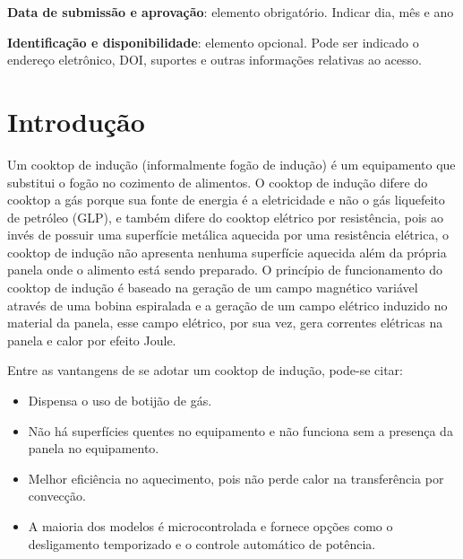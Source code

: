 \documentclass[
	article,			%
	11pt,				%
	oneside,			%
	a4paper,			%
	english,			%
	brazil,				%
	sumario=tradicional
	]{abntex2}
\begin{document}

\begin{center}\smaller
\textbf{Data de submissão e aprovação}: elemento obrigatório. Indicar dia, mês e ano

\textbf{Identificação e disponibilidade}: elemento opcional. Pode ser indicado 
o endereço eletrônico, DOI, suportes e outras informações relativas ao acesso.
\end{center}

\textual

\section{Introdução}

Um cooktop de indução (informalmente fogão de indução) é um equipamento que substitui o fogão no cozimento de alimentos. O cooktop de indução difere do cooktop a gás porque sua fonte de energia é a eletricidade e não o gás liquefeito de petróleo (GLP), e também difere do cooktop elétrico por resistência, pois ao invés de possuir uma superfície metálica aquecida por uma resistência elétrica, o cooktop de indução não apresenta nenhuma superfície aquecida além da própria panela onde o alimento está sendo preparado. O princípio de funcionamento do cooktop de indução é baseado na geração de um campo magnético variável através de uma bobina espiralada e a geração de um campo elétrico induzido no material da panela, esse campo elétrico, por sua vez, gera correntes elétricas na panela e calor por efeito Joule.

Entre as vantangens de se adotar um cooktop de indução, pode-se citar:

\begin{itemize}
	\item Dispensa o uso de botijão de gás.
	\item Não há superfícies quentes no equipamento e não funciona sem a presença da panela no equipamento.
	\item Melhor eficiência no aquecimento, pois não perde calor na transferência por convecção.
	\item A maioria dos modelos é microcontrolada e fornece opções como o desligamento temporizado e o controle automático de potência.
\end{itemize}
\end{document}

